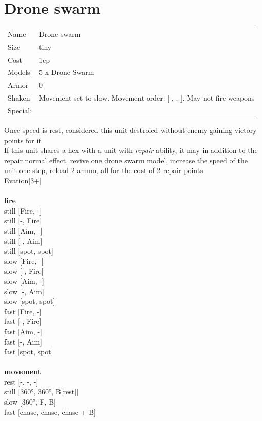 \clearpage

\section{ Drone swarm }

\begin{tabular}{ll}
  Name & Drone swarm \\
  Size & tiny\\
  Cost & 1cp\\
  Models & 5 x Drone Swarm\\
  Armor & 0\\
  Shaken & Movement set to slow. Movement order: [-,-,-]. May not fire weapons\\
  Special: \\
\end{tabular}

\noindent Once speed is rest, considered this unit destroied without enemy gaining victory points for it\\ 
If this unit shares a hex with a unit with {{\it repair}} ability, it may in addition to the repair normal effect, revive one drone swarm model, increase the speed of the unit one step, reload 2 ammo, all for the cost of 2 repair points\\ 
Evation[3+]\\ 


\ \\ {\bf fire } \\
still [Fire, -] \\
still [-, Fire] \\
still [Aim, -] \\
still [-, Aim] \\
still [spot, spot] \\
slow [Fire, -] \\
slow [-, Fire] \\
slow [Aim, -] \\
slow [-, Aim] \\
slow [spot, spot] \\
fast [Fire, -] \\
fast [-, Fire] \\
fast [Aim, -] \\
fast [-, Aim] \\
fast [spot, spot] \\
\ \\ {\bf movement } \\
rest [-, -, -] \\
still [360°, 360°, B[rest]] \\
slow [360°, F, B] \\
fast [chase, chase, chase + B] \\


